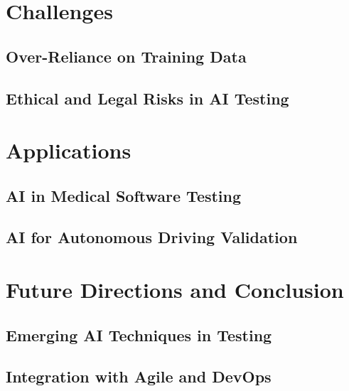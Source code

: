\documentclass[manuscript,screen,review]{acmart}
\begin{document}
\section{Challenges}

\subsection{Over-Reliance on Training Data}

\subsection{Ethical and Legal Risks in AI Testing}

\section{Applications}

\subsection{AI in Medical Software Testing}

\subsection{AI for Autonomous Driving Validation}

\section{Future Directions and Conclusion}

\subsection{Emerging AI Techniques in Testing}

\subsection{Integration with Agile and DevOps}

\vspace{2ex}
\end{document}
